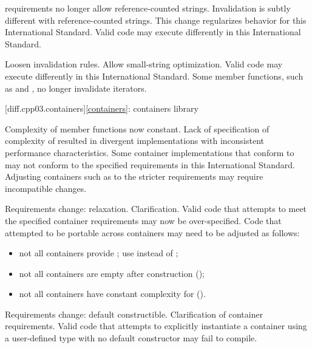 \change {} requirements no longer allow reference-counted
strings.
\rationale Invalidation is subtly different with reference-counted strings.
This change regularizes behavior for this International Standard.
\effect
Valid \CppIII{} code may execute differently in this International Standard.

\change Loosen  invalidation rules.
\rationale Allow small-string optimization.
\effect
Valid \CppIII{} code may execute differently in this International Standard.
Some  member functions, such as  and ,
no longer invalidate iterators.

[diff.cpp03.containers]{\ref{containers}: containers library}

\change Complexity of  member functions now constant.
\rationale Lack of specification of complexity of  resulted in
divergent implementations with inconsistent performance characteristics.
\effect
Some container implementations that conform to \CppIII{} may not conform to the
specified  requirements in this International Standard. Adjusting
containers such as  to the stricter requirements may require
incompatible changes.

\change Requirements change: relaxation.
\rationale Clarification.
\effect
Valid \CppIII{} code that attempts to meet the specified container requirements
may now be over-specified. Code that attempted to be portable across containers
may need to be adjusted as follows:
\begin{itemize}
\item not all containers provide ; use  instead
of ;
\item not all containers are empty after construction ();
\item not all containers have constant complexity for  ().
\end{itemize}

\change Requirements change: default constructible.
\rationale Clarification of container requirements.
\effect
Valid \CppIII{} code that attempts to explicitly instantiate a container using
a user-defined type with no default constructor may fail to compile.

